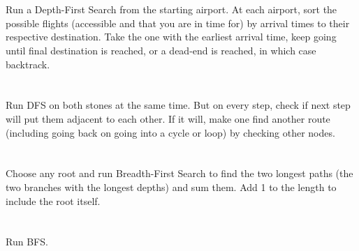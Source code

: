 \documentclass[11pt,letterpaper]{article}
\begin{document}
	\section{}
		Run a Depth-First Search from the starting airport. At each airport, sort the possible flights (accessible and that you are in time for) by arrival times to their respective destination. Take the one with the earliest arrival time, keep going until final destination is reached, or a dead-end is reached, in which case backtrack.
		
	\section{}
		Run DFS on both stones at the same time. But on every step, check if next step will put them adjacent to each other. If it will, make one find another route (including going back on going into a cycle or loop) by checking other nodes.
	
	\section{}
		Choose any root and run Breadth-First Search to find the two longest paths (the two branches with the longest depths) and sum them. Add 1 to the length to include the root itself.
		
	\section{}
		Run BFS.
	
\end{document}

